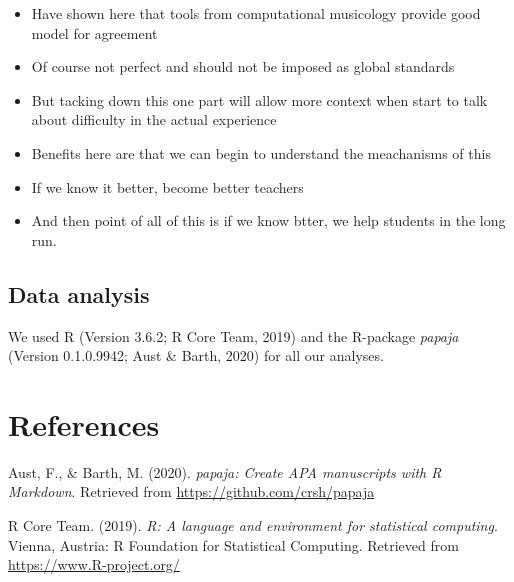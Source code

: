 \documentclass[english,man,floatsintext]{apa6}
\providecommand{\tightlist}{%
  \setlength{\itemsep}{0pt}\setlength{\parskip}{0pt}}
\begin{document}
\begin{itemize}
\tightlist
\item
  Have shown here that tools from computational musicology provide good model for agreement
\item
  Of course not perfect and should not be imposed as global standards
\item
  But tacking down this one part will allow more context when start to talk about difficulty in the actual experience
\item
  Benefits here are that we can begin to understand the meachanisms of this
\item
  If we know it better, become better teachers
\item
  And then point of all of this is if we know btter, we help students in the long run.
\end{itemize}

\hypertarget{data-analysis}{%
\subsection{Data analysis}\label{data-analysis}}

We used R (Version 3.6.2; R Core Team, 2019) and the R-package \emph{papaja} (Version 0.1.0.9942; Aust \& Barth, 2020) for all our analyses.

\newpage

\hypertarget{references}{%
\section{References}\label{references}}

\begingroup
\setlength{\parindent}{-0.5in}
\setlength{\leftskip}{0.5in}

\hypertarget{refs}{}
\leavevmode\hypertarget{ref-R-papaja}{}%
Aust, F., \& Barth, M. (2020). \emph{papaja: Create APA manuscripts with R Markdown}. Retrieved from \url{https://github.com/crsh/papaja}

\leavevmode\hypertarget{ref-R-base}{}%
R Core Team. (2019). \emph{R: A language and environment for statistical computing}. Vienna, Austria: R Foundation for Statistical Computing. Retrieved from \url{https://www.R-project.org/}

\endgroup
\end{document}
